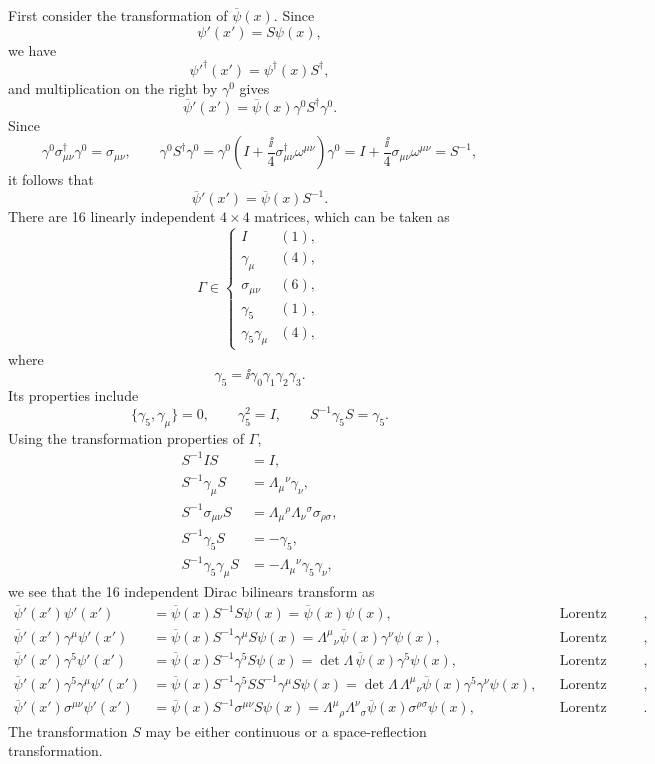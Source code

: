 First consider the transformation of $\overline\psi(x)$. Since
\[
\psi'(x')=S\psi(x),
\]
we have
\[
\psi'^\dagger(x')=\psi^\dagger(x)S^\dagger,
\]
and multiplication on the right by $\gamma^0$ gives
\[
\overline\psi'(x')=\overline\psi(x)\gamma^0 S^\dagger\gamma^0.
\]
Since
\[
\gamma^0\sigma_{\mu\nu}^\dagger\gamma^0=\sigma_{\mu\nu},
\qquad
\gamma^0S^\dagger\gamma^0=
\gamma^0\left(I+\frac{\ii}{4}\sigma_{\mu\nu}^\dagger\omega^{\mu\nu}\right)\gamma^0
=I+\frac{\ii}{4}\sigma_{\mu\nu}\omega^{\mu\nu}=S^{-1},
\]
it follows that
\[
\overline\psi'(x')=\overline\psi(x)S^{-1}.
\]
There are 16 linearly independent $4\times4$ matrices, which can be taken as
\[
\Gamma\in\left\{\begin{array}{ll}
I&(1),\\
\gamma_\mu&(4),\\
\sigma_{\mu\nu}&(6),\\
\gamma_5&(1),\\
\gamma_5\gamma_\mu&(4),
\end{array}\right.
\]
where
\[
\gamma_5=\ii\gamma_0\gamma_1\gamma_2\gamma_3.
\]
Its properties include
\[
\{\gamma_5,\gamma_\mu\}=0,\qquad
\gamma_5^2=I,\qquad S^{-1}\gamma_5S=\gamma_5.
\]
Using the transformation properties of $\Gamma$,
\begin{align*}
S^{-1}IS&=I,\\
S^{-1}\gamma_\mu S&=\Lambda_\mu{}^\nu\gamma_\nu,\\
S^{-1}\sigma_{\mu\nu}S&=\Lambda_\mu{}^\rho\Lambda_\nu{}^\sigma\sigma_{\rho\sigma},\\
S^{-1}\gamma_5S&=-\gamma_5,\\
S^{-1}\gamma_5\gamma_\mu S&=-\Lambda_\mu{}^\nu\gamma_5\gamma_\nu,
\end{align*}
we see that the 16 independent Dirac bilinears transform as
\begingroup\small
\begin{align*}
\overline\psi'(x')\psi'(x')&=\overline\psi(x)S^{-1}S\psi(x)
=\overline\psi(x)\psi(x),&&\text{Lorentz scalar},\\
\overline\psi'(x')\gamma^\mu\psi'(x')
&=\overline\psi(x)S^{-1}\gamma^\mu S\psi(x)
=\Lambda^\mu{}_{\nu}\overline\psi(x)\gamma^\nu\psi(x),&&\text{Lorentz vector},\\
\overline\psi'(x')\gamma^5\psi'(x')
&=\overline\psi(x)S^{-1}\gamma^5S\psi(x)
=\det\Lambda\,\overline\psi(x)\gamma^5\psi(x),&&\text{Lorentz pseudoscalar},\\
\overline\psi'(x')\gamma^5\gamma^\mu\psi'(x')
&=\overline\psi(x)S^{-1}\gamma^5SS^{-1}\gamma^\mu S\psi(x)
=\det\Lambda\,\Lambda^\mu{}_{\nu}\overline\psi(x)\gamma^5\gamma^\nu\psi(x),&&\text{Lorentz pseudovector},\\
\overline\psi'(x')\sigma^{\mu\nu}\psi'(x')
&=\overline\psi(x)S^{-1}\sigma^{\mu\nu}S\psi(x)
=\Lambda^\mu{}_{\rho}\Lambda^\nu{}_{\sigma}
\overline\psi(x)\sigma^{\rho\sigma}\psi(x),&&\text{Lorentz tensor}.
\end{align*}
\endgroup
The transformation $S$ may be either continuous or a space-reflection transformation.